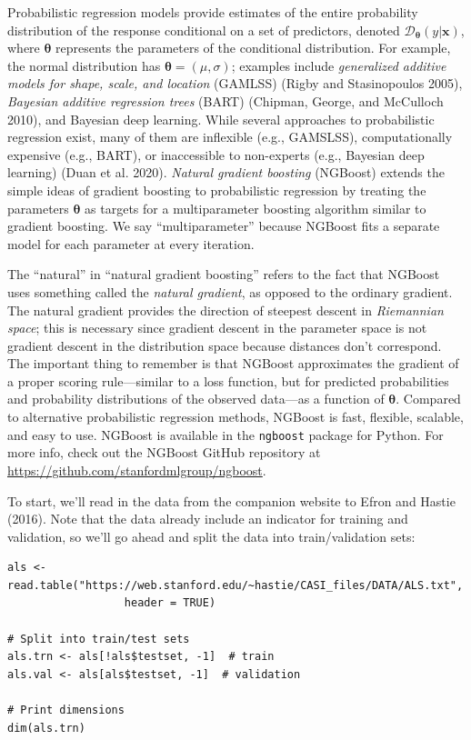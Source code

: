 Probabilistic regression models provide estimates of the entire probability distribution of the response conditional on a set of predictors, denoted \(\mathcal{D}_{\boldsymbol{\theta}}\left(y | \boldsymbol{x}\right)\), where \(\boldsymbol{\theta}\) represents the parameters of the conditional distribution. For example, the normal distribution has \(\boldsymbol{\theta} = \left(\mu, \sigma\right)\); examples include \emph{generalized additive models for shape, scale, and location} (GAMLSS) (Rigby and Stasinopoulos 2005), \emph{Bayesian additive regression trees} (BART) (Chipman, George, and McCulloch 2010), and Bayesian deep learning. While several approaches to probabilistic regression exist, many of them are inflexible (e.g., GAMSLSS), computationally expensive (e.g., BART), or inaccessible to non-experts (e.g., Bayesian deep learning) (Duan et al. 2020). \emph{Natural gradient boosting} (NGBoost) extends the simple ideas of gradient boosting to probabilistic regression by treating the parameters \(\boldsymbol{\theta}\) as targets for a multiparameter boosting algorithm similar to gradient boosting. We say ``multiparameter'' because NGBoost fits a separate model for each parameter at every iteration.

The ``natural'' in ``natural gradient boosting'' refers to the fact that NGBoost uses something called the \emph{natural gradient}, as opposed to the ordinary gradient. The natural gradient provides the direction of steepest descent in \emph{Riemannian space}; this is necessary since gradient descent in the parameter space is not gradient descent in the distribution space because distances don't correspond. The important thing to remember is that NGBoost approximates the gradient of a proper scoring rule---similar to a loss function, but for predicted probabilities and probability distributions of the observed data---as a function of \(\boldsymbol{\theta}\). Compared to alternative probabilistic regression methods, NGBoost is fast, flexible, scalable, and easy to use. NGBoost is available in the \texttt{ngboost} package for Python. For more info, check out the NGBoost GitHub repository at \url{https://github.com/stanfordmlgroup/ngboost}.

To start, we'll read in the data from the companion website to Efron and Hastie (2016). Note that the data already include an indicator for training and validation, so we'll go ahead and split the data into train/validation sets:

\begin{verbatim}
als <- read.table("https://web.stanford.edu/~hastie/CASI_files/DATA/ALS.txt", 
                  header = TRUE)

# Split into train/test sets
als.trn <- als[!als$testset, -1]  # train
als.val <- als[als$testset, -1]  # validation

# Print dimensions
dim(als.trn)
\end{verbatim}

